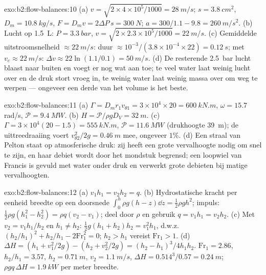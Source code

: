 \begin{solution}{exo:b2:flow-balances:10}
(a) $v = \sqrt{2 \times 4 \times 10^5/1000} = \qty{28}{m/s}$;
$s = \qty{3.8}{cm^2}$, $D_m =
\qty{10.8}{kg/s}$,
$F = D_mv = 2\Delta P\,s = \qty{300}{N}$;
$a = 300/1.1 - 9.8 =
\qty{260}{m/s^2}$. (b) Lucht op \qty{1.5}{L}:
$P = \qty{3.3}{bar}$,
$v = \sqrt{2 \times 2.3 \times
10^5/1000} = \qty{22}{m/s}$. (c) Gemiddelde
uitstroomsnelheid $\approx \qty{22}{m/s}$: duur
$\approx 10^{-3}
/(3.8 \times 10^{-4} \times 22) = \qty{0.12}{s}$;
 met $v_e \approx \qty{22}{m/s}$:
$\Delta v \approx 22\ln(1.1/0.1) = \qty{50}{m/s}$. (d) De resterende
\qty{2.5}{bar} lucht blaast naar buiten en voegt er nog wat aan toe; te veel
water laat weinig lucht over en de druk stort vroeg in, te weinig water laat
weinig massa over om weg te werpen --- ongeveer een derde van het volume is
het beste.
\end{solution}

\begin{solution}{exo:b2:flow-balances:11}
(a)
$\Gamma = D_mr_1v_{\theta1} = 3 \times 10^4 \times 20 = \qty{600}{kN.m}$,
$\omega = 15.7$ rad/s, $\mathcal P = \qty{9.4}{MW}$. (b)
$H = \mathcal P/\rho gD_V = \qty{32}{m}$. (c)
$\Gamma = 3 \times
10^4(20 - 1.5) = \qty{555}{kN.m}$,
$\mathcal P = \qty{11.6}{MW}$ (drukhoogte \qty{39}{m}); de uittreedraaiing
voert $v_{\theta2}^2/2g = \qty{0.46}{m}$ mee, ongeveer $1\%$. (d) Een straal
van Pelton staat op atmosferische druk: zij heeft een grote vervalhoogte
nodig om snel te zijn, en haar debiet wordt door het mondstuk begrensd; een
loopwiel van Francis is gevuld met water onder druk en verwerkt grote
debieten bij matige vervalhoogten.
\end{solution}

\begin{solution}{exo:b2:flow-balances:12}
(a) $v_1h_1 = v_2h_2 = q$. (b) Hydrostatische kracht per eenheid breedte op
een doorsnede $\int_0^h\rho g(h - z)\dd z = \tfrac12\rho gh^2$; impuls:
$\tfrac12\rho g(h_1^2
- h_2^2) = \rho q(v_2 - v_1)$; deel door $\rho$ en
gebruik $q = v_1h_1 = v_2h_2$. (c) Met $v_2 = v_1h_1/h_2$ en $h_1 \ne h_2$:
$\tfrac12g(h_1 + h_2)h_2 = v_1^2h_1$, d.w.z.\
$(h_2/h_1)^2 + h_2/h_1 - 2\mathrm{Fr}_1^2 = 0$; $h_2 > h_1$ vereist
$\mathrm{Fr}_1 > 1$. (d)
$\Delta H = (h_1 + v_1^2/2g) - (h_2 + v_2^2/2g) = (h_2 - h_1)^3/4h_1h_2$.
$\mathrm{Fr}_1 = 2.86$, $h_2/h_1 = 3.57$, $h_2 = \qty{0.71}{m}$,
$v_2 = \qty{1.1}{m/s}$, $\Delta H = 0.514^3/0.57 = \qty{0.24}{m}$;
$\rho gq\,\Delta H = \qty{1.9}{kW}$ per meter breedte.
\end{solution}

